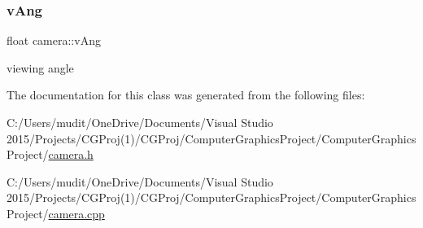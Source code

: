 \hypertarget{classcamera_ae8f2970ceb202edb61903e139271913d}{}\label{classcamera_ae8f2970ceb202edb61903e139271913d} 
\subsubsection{\texorpdfstring{v\+Ang}{vAng}}
{\footnotesize\ttfamily float camera\+::v\+Ang\hspace{0.3cm}{\ttfamily [private]}}



viewing angle 



The documentation for this class was generated from the following files\+:\begin{DoxyCompactItemize}
\item 
C\+:/\+Users/mudit/\+One\+Drive/\+Documents/\+Visual Studio 2015/\+Projects/\+C\+G\+Proj(1)/\+C\+G\+Proj/\+Computer\+Graphics\+Project/\+Computer\+Graphics\+Project/\hyperlink{camera_8h}{camera.\+h}\item 
C\+:/\+Users/mudit/\+One\+Drive/\+Documents/\+Visual Studio 2015/\+Projects/\+C\+G\+Proj(1)/\+C\+G\+Proj/\+Computer\+Graphics\+Project/\+Computer\+Graphics\+Project/\hyperlink{camera_8cpp}{camera.\+cpp}\end{DoxyCompactItemize}
